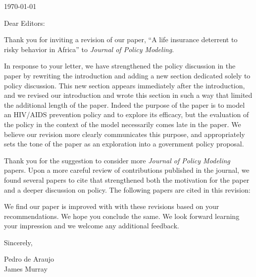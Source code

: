 \documentclass[11pt]{article}
\begin{document}
\today

Dear Editors:

Thank you for inviting a revision of our paper, ``A life insurance deterrent to risky behavior in Africa'' to \textit{Journal of Policy Modeling}. 

In response to your letter, we have strengthened the policy discussion in the paper by rewriting the introduction and adding a new section dedicated solely to policy discussion.  This new section appears immediately after the introduction, and we revised our introduction and wrote this section in such a way that limited the additional length of the paper.  Indeed the purpose of the paper is to model an HIV/AIDS prevention policy and to explore its efficacy, but the evaluation of the policy in the context of the model necessarily comes late in the paper.  We believe our revision more clearly communicates this purpose, and appropriately sets the tone of the paper as an exploration into a government policy proposal.

Thank you for the suggestion to consider more \textit{Journal of Policy Modeling} papers.  Upon a more careful review of contributions published in the journal, we found several papers to cite that strengthened both the motivation for the paper and a deeper discussion on policy.  The following papers are cited in this revision: 

\nocite{CHR1994}\nocite{Arndt2003}\nocite{HC1994}\nocite{RVP2002}\nocite{RS2008}\nocite{GV2001}
\vspace*{-4pc}



We find our paper is improved with with these revisions based on your recommendations.  We hope you conclude the same.  We look forward learning your impression and we welcome any additional feedback.

Sincerely,

Pedro de Araujo\\
James Murray
\end{document}
